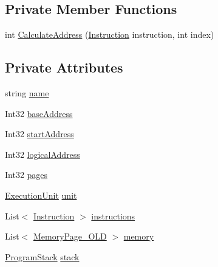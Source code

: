 \subsection*{Private Member Functions}
\begin{DoxyCompactItemize}
\item 
int \hyperlink{class_c_p_u___o_s___simulator_1_1_c_p_u_1_1_simulator_program_a6ab84d4093d03fc387e4288dfc566388}{Calculate\+Address} (\hyperlink{class_c_p_u___o_s___simulator_1_1_c_p_u_1_1_instruction}{Instruction} instruction, int index)
\end{DoxyCompactItemize}
\subsection*{Private Attributes}
\begin{DoxyCompactItemize}
\item 
string \hyperlink{class_c_p_u___o_s___simulator_1_1_c_p_u_1_1_simulator_program_ad4797b5d81ceb01cd4207a97b7af36c5}{name}
\item 
Int32 \hyperlink{class_c_p_u___o_s___simulator_1_1_c_p_u_1_1_simulator_program_aaea4fb02fb8d22806ce58b957f9b573d}{base\+Address}
\item 
Int32 \hyperlink{class_c_p_u___o_s___simulator_1_1_c_p_u_1_1_simulator_program_a7b2581eff41da814292bf29936ab5318}{start\+Address}
\item 
Int32 \hyperlink{class_c_p_u___o_s___simulator_1_1_c_p_u_1_1_simulator_program_acc3f9414f8e4092ac504378d28cbffa7}{logical\+Address}
\item 
Int32 \hyperlink{class_c_p_u___o_s___simulator_1_1_c_p_u_1_1_simulator_program_ac4d19d17c7ee206ad6343884f3390054}{pages}
\item 
\hyperlink{class_c_p_u___o_s___simulator_1_1_c_p_u_1_1_execution_unit}{Execution\+Unit} \hyperlink{class_c_p_u___o_s___simulator_1_1_c_p_u_1_1_simulator_program_a10e4c29c3ed9b84c0fb8aee7613cabf9}{unit}
\item 
List$<$ \hyperlink{class_c_p_u___o_s___simulator_1_1_c_p_u_1_1_instruction}{Instruction} $>$ \hyperlink{class_c_p_u___o_s___simulator_1_1_c_p_u_1_1_simulator_program_a30b501e0b2d012212077059be49857cf}{instructions}
\item 
List$<$ \hyperlink{class_c_p_u___o_s___simulator_1_1_memory_1_1_memory_page___o_l_d}{Memory\+Page\+\_\+\+O\+L\+D} $>$ \hyperlink{class_c_p_u___o_s___simulator_1_1_c_p_u_1_1_simulator_program_a6f6d6f2bd8f87bab4225655d7f939f2f}{memory}
\item 
\hyperlink{class_c_p_u___o_s___simulator_1_1_c_p_u_1_1_program_stack}{Program\+Stack} \hyperlink{class_c_p_u___o_s___simulator_1_1_c_p_u_1_1_simulator_program_a85f44af349486db4b141b3946bf21a64}{stack}
\end{DoxyCompactItemize}



